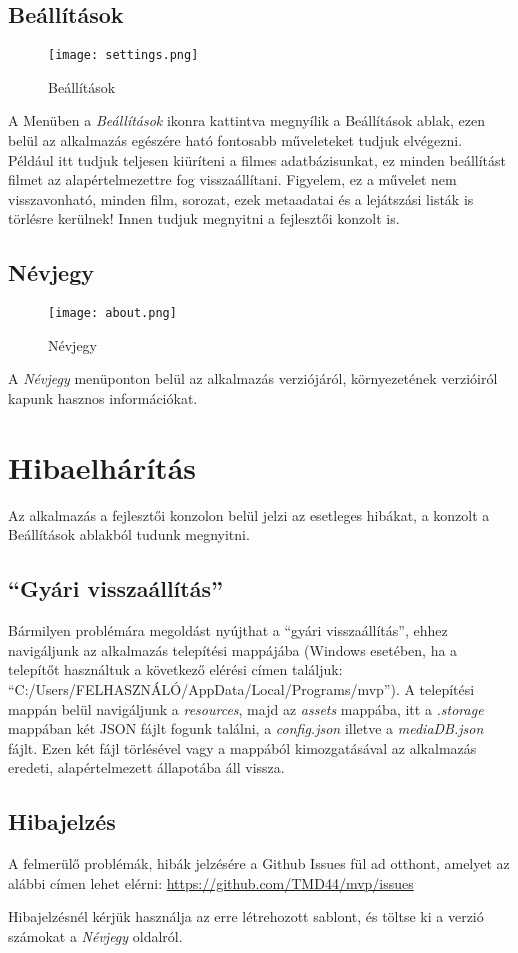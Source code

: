 \subsection{Beállítások}
\begin{figure}[H]
	\centering
	\texttt{[image: settings.png]}
	\caption{Beállítások}
	\label{fig:settings}
\end{figure}
A Menüben a {\it Beállítások} ikonra kattintva megnyílik a Beállítások ablak, ezen belül az alkalmazás egészére ható fontosabb műveleteket tudjuk elvégezni. Például itt tudjuk teljesen kiüríteni a filmes adatbázisunkat, ez minden beállítást filmet az alapértelmezettre fog visszaállítani. Figyelem, ez a művelet nem visszavonható, minden film, sorozat, ezek metaadatai és a lejátszási listák is törlésre kerülnek!
Innen tudjuk megnyitni a fejlesztői konzolt is.

\subsection{Névjegy}
\begin{figure}[H]
	\centering
	\texttt{[image: about.png]}
	\caption{Névjegy}
	\label{fig:about}
\end{figure}
A {\it Névjegy} menüponton belül az alkalmazás verziójáról, környezetének verzióiról kapunk hasznos információkat.

\cleardoublepage
\section{Hibaelhárítás}
Az alkalmazás a fejlesztői konzolon belül jelzi az esetleges hibákat, a konzolt a Beállítások ablakból tudunk megnyitni.

\subsection{``Gyári visszaállítás''}
Bármilyen problémára megoldást nyújthat a ``gyári visszaállítás'', ehhez navigáljunk az alkalmazás telepítési mappájába (Windows esetében, ha a telepítőt használtuk a következő elérési címen találjuk: ``C:/Users/FELHASZNÁLÓ/AppData/Local/Programs/mvp''). A telepítési mappán belül navigáljunk a {\it resources}, majd az {\it assets} mappába, itt a {\it .storage} mappában két JSON fájlt fogunk találni, a {\it config.json} illetve a {\it mediaDB.json} fájlt. Ezen két fájl törlésével vagy a mappából kimozgatásával az alkalmazás eredeti, alapértelmezett állapotába áll vissza.

\subsection{Hibajelzés}
A felmerülő problémák, hibák jelzésére a Github Issues fül ad otthont, amelyet az alábbi címen lehet elérni: \url{https://github.com/TMD44/mvp/issues}

Hibajelzésnél kérjük használja az erre létrehozott sablont, és töltse ki a verzió számokat a {\it Névjegy} oldalról.

